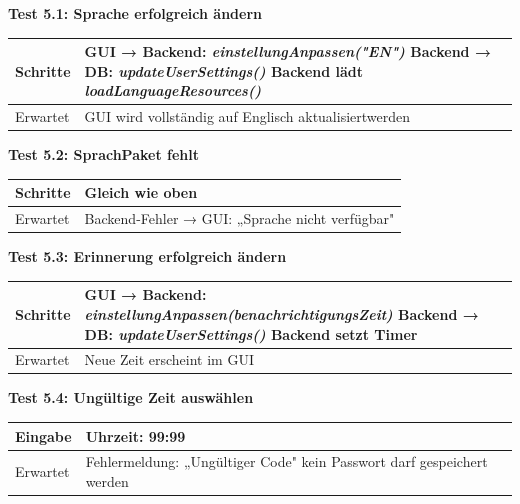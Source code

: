 \textbf{Test 5.1: Sprache erfolgreich ändern} \\
\begin{tabular}{|p{4cm}|p{10cm}|}
    \hline
    Schritte & 
    GUI → Backend: \textit{einstellungAnpassen("EN")} 
    Backend → DB: \textit{updateUserSettings()} 
    Backend lädt \textit{loadLanguageResources()} \\
    \hline
    Erwartet & GUI wird vollständig auf Englisch aktualisiertwerden \\
    \hline
\end{tabular}

\vspace{0.5cm}

\textbf{Test 5.2: SprachPaket fehlt} \\
\begin{tabular}{|p{4cm}|p{10cm}|}
    \hline
    Schritte & Gleich wie oben \\
    \hline
    Erwartet & Backend-Fehler → GUI: „Sprache nicht verfügbar" \\
    \hline
\end{tabular}

\vspace{0.5cm}

\textbf{Test 5.3: Erinnerung erfolgreich ändern} \\
\begin{tabular}{|p{4cm}|p{10cm}|}
    \hline
    Schritte & 
    GUI → Backend: \textit{einstellungAnpassen(benachrichtigungsZeit)} 
    Backend → DB: \textit{updateUserSettings()} 
    Backend setzt Timer \\
    \hline
    Erwartet & Neue Zeit erscheint im GUI \\
    \hline
\end{tabular}

\vspace{0.5cm}

\textbf{Test 5.4: Ungültige Zeit auswählen} \\
\begin{tabular}{|p{4cm}|p{10cm}|}
    \hline
    Eingabe & Uhrzeit: 99:99 \\
    \hline
    Erwartet & Fehlermeldung: „Ungültiger Code" kein Passwort darf gespeichert werden \\
    \hline
\end{tabular}

